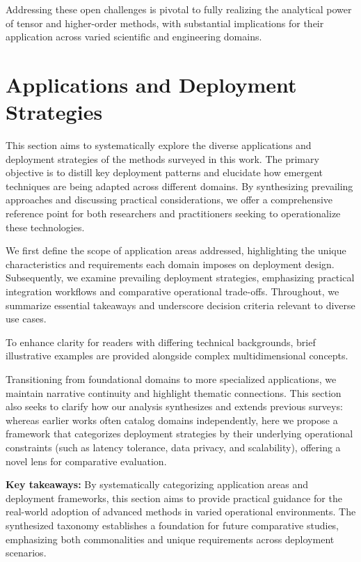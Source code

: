 \documentclass[sigconf]{acmart}
\begin{document}
Addressing these open challenges is pivotal to fully realizing the analytical power of tensor and higher-order methods, with substantial implications for their application across varied scientific and engineering domains.

\section{Applications and Deployment Strategies}

This section aims to systematically explore the diverse applications and deployment strategies of the methods surveyed in this work. The primary objective is to distill key deployment patterns and elucidate how emergent techniques are being adapted across different domains. By synthesizing prevailing approaches and discussing practical considerations, we offer a comprehensive reference point for both researchers and practitioners seeking to operationalize these technologies.

We first define the scope of application areas addressed, highlighting the unique characteristics and requirements each domain imposes on deployment design. Subsequently, we examine prevailing deployment strategies, emphasizing practical integration workflows and comparative operational trade-offs. Throughout, we summarize essential takeaways and underscore decision criteria relevant to diverse use cases.

To enhance clarity for readers with differing technical backgrounds, brief illustrative examples are provided alongside complex multidimensional concepts.

Transitioning from foundational domains to more specialized applications, we maintain narrative continuity and highlight thematic connections. This section also seeks to clarify how our analysis synthesizes and extends previous surveys: whereas earlier works often catalog domains independently, here we propose a framework that categorizes deployment strategies by their underlying operational constraints (such as latency tolerance, data privacy, and scalability), offering a novel lens for comparative evaluation.

\textbf{Key takeaways:} By systematically categorizing application areas and deployment frameworks, this section aims to provide practical guidance for the real-world adoption of advanced methods in varied operational environments. The synthesized taxonomy establishes a foundation for future comparative studies, emphasizing both commonalities and unique requirements across deployment scenarios.
\end{document}
